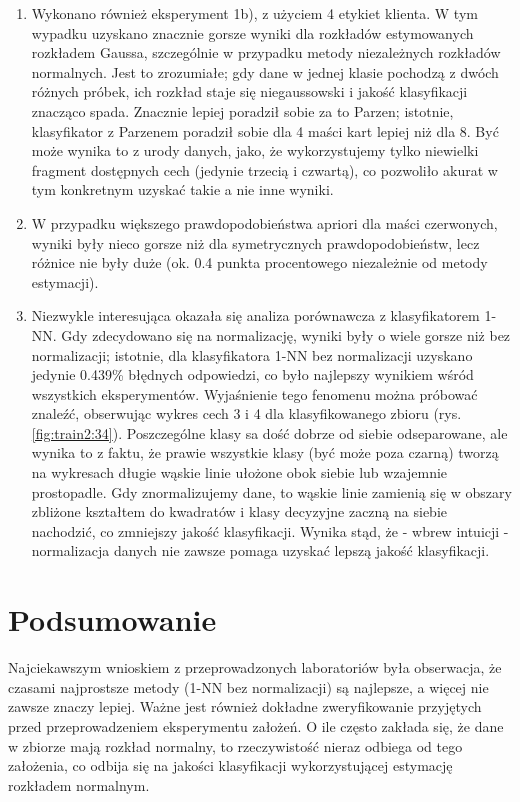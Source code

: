 \documentclass{article}
\begin{document}
\begin{enumerate}
		\item Wykonano również eksperyment 1b), z użyciem 4 etykiet klienta. W tym wypadku uzyskano znacznie gorsze wyniki dla rozkładów estymowanych rozkładem Gaussa, szczególnie w przypadku metody niezależnych rozkładów normalnych. Jest to zrozumiałe; gdy dane w jednej klasie pochodzą z dwóch różnych próbek, ich rozkład staje się niegaussowski i jakość klasyfikacji znacząco spada. Znacznie lepiej poradził sobie za to Parzen; istotnie, klasyfikator z Parzenem poradził sobie dla 4 maści kart lepiej niż dla 8. Być może wynika to z urody danych, jako, że wykorzystujemy tylko niewielki fragment dostępnych cech (jedynie trzecią i czwartą), co pozwoliło akurat w tym konkretnym uzyskać takie a nie inne wyniki.
		\item W przypadku większego prawdopodobieństwa apriori dla maści czerwonych, wyniki były nieco gorsze niż dla symetrycznych prawdopodobieństw, lecz różnice nie były duże (ok. 0.4 punkta procentowego niezależnie od metody estymacji). 
		\item Niezwykle interesująca okazała się analiza porównawcza z klasyfikatorem 1-NN. Gdy zdecydowano się na normalizację, wyniki były o wiele gorsze niż bez normalizacji; istotnie, dla klasyfikatora 1-NN bez normalizacji uzyskano jedynie 0.439\% błędnych odpowiedzi, co było najlepszy wynikiem wśród wszystkich eksperymentów. Wyjaśnienie tego fenomenu można próbować znaleźć, obserwując wykres cech 3 i 4 dla klasyfikowanego zbioru (rys. \ref{fig:train2:34}). Poszczególne klasy sa dość dobrze od siebie odseparowane, ale wynika to z faktu, że prawie wszystkie klasy (być może poza czarną) tworzą na wykresach długie wąskie linie ułożone obok siebie lub wzajemnie prostopadle. Gdy znormalizujemy dane, to wąskie linie zamienią się w obszary zbliżone kształtem do kwadratów i klasy decyzyjne zaczną na siebie nachodzić, co zmniejszy jakość klasyfikacji. Wynika stąd, że - wbrew intuicji - normalizacja danych nie zawsze pomaga uzyskać lepszą jakość klasyfikacji. 
	\end{enumerate}
	
	\section{Podsumowanie}
	Najciekawszym wnioskiem z przeprowadzonych laboratoriów była obserwacja, że czasami najprostsze metody (1-NN bez normalizacji) są najlepsze, a więcej nie zawsze znaczy lepiej. Ważne jest również dokładne zweryfikowanie przyjętych przed przeprowadzeniem eksperymentu założeń. O ile często zakłada się, że dane w zbiorze mają rozkład normalny, to rzeczywistość nieraz odbiega od tego założenia, co odbija się na jakości klasyfikacji wykorzystującej estymację rozkładem normalnym. 
	
\end{document}
